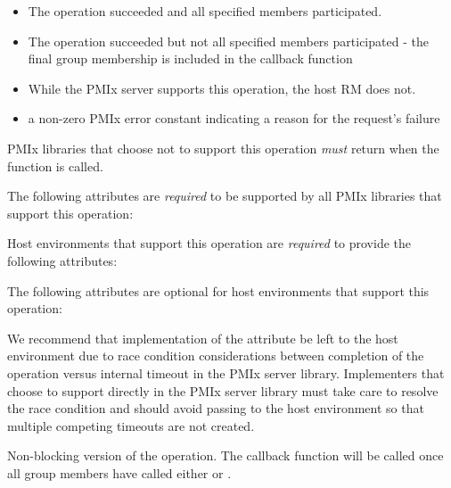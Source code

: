 \begin{itemize}
\item {} The operation succeeded and all specified members participated.
\item {} The operation succeeded but not all specified members participated - the final group membership is included in the callback function
\item {} While the \ac{PMIx} server supports this operation, the host \ac{RM} does not.
\item a non-zero \ac{PMIx} error constant indicating a reason for the request's failure
\end{itemize}

\reqattrstart
\ac{PMIx} libraries that choose not to support this operation \textit{must} return  when the function is called.

The following attributes are \textit{required} to be supported by all \ac{PMIx} libraries that support this operation:


Host environments that support this operation are \textit{required} to provide the following attributes:


\reqattrend

\optattrstart
The following attributes are optional for host environments that support this operation:


\optattrend

\adviceimplstart
We recommend that implementation of the  attribute be left to the host environment due to race condition considerations between completion of the operation versus internal timeout in the \ac{PMIx} server library. Implementers that choose to support  directly in the \ac{PMIx} server library must take care to resolve the race condition and should avoid passing  to the host environment so that multiple competing timeouts are not created.
\adviceimplend


\descr

Non-blocking version of the  operation. The callback function will be called once all group members have called either  or .

